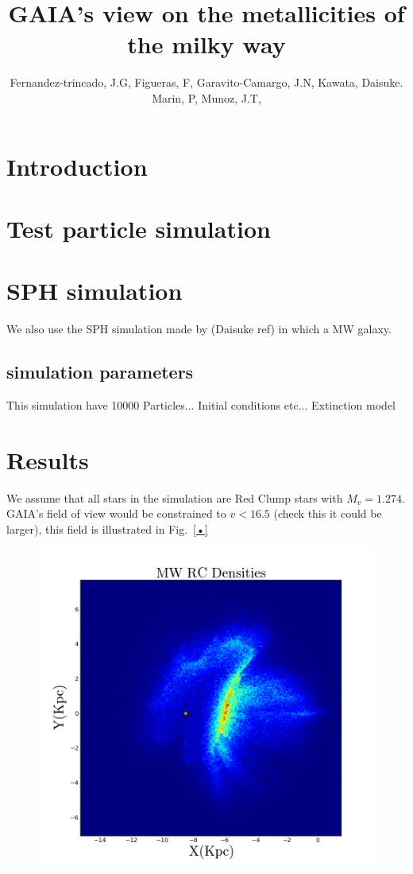 \documentclass[proceedings, preprint]{rmaa}
\title{GAIA's view on the metallicities of the milky way}
\author{
  Fernandez-trincado, J.G,\altaffilmark{1} 
  Figueras, F, \altaffilmark{2}  
  Garavito-Camargo, J.N,\altaffilmark{3}
  Kawata, Daisuke. \altaffilmark{4}
  Marin, P,\altaffilmark{5}
  Munoz, J.T, \altaffilmark{6}}
\begin{document}
\maketitle


\section{Introduction}

\section{Test particle simulation}

\section{SPH simulation}

We also use the SPH simulation made by (Daisuke ref) in which a MW galaxy.

\subsection{simulation parameters}

This simulation have 10000 Particles...
Initial conditions etc...
Extinction model

\section{Results}

We assume that all stars in the simulation are Red Clump stars with $M_{v} = 1.274$.
GAIA's field of view would be constrained to $v < 16.5$ (check this it could be larger), this 
field is illustrated in Fig.~\ref{•}

\begin{figure}
\includegraphics[scale=0.3]{GalaxyRC.png}
{\label{GAIA field of view}}
\end{figure}
\end{document}
